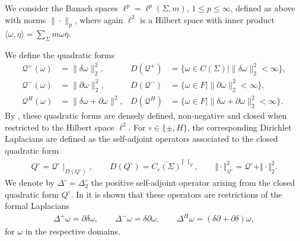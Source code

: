 \documentclass[10pt]{amsart}
\theoremstyle{definition}
\newcommand{\F}{{F}}
\newcommand{\Q}{\mathcal{Q}}
\begin{document}
We consider the Banach spaces $\ell^p=\ell^p( \Sigma,m)$, $1\leq p\leq \infty$, defined as above with norms $\|\cdot\|_p$, where again $\ell^2$ is a Hilbert space  with inner product $\langle\omega,\eta\rangle = \sum_{ \Sigma}m\omega\overline{\eta}$.


We define the quadratic forms
\begin{align*}
\Q^+(\omega) &= \|\delta\omega\|^{2}_2, & D(\Q^+) &= \lbrace \omega\in C(\Sigma)\mid \|\delta\omega\|^{2}_2<\infty\rbrace,\\
\Q^-(\omega) &= \|\partial\omega\|^{2}_2, & D(\Q^-) &= \lbrace \omega\in \F\mid\|\partial\omega\|^{2}_2<\infty\rbrace,\\
\Q^H(\omega) &= \|\delta\omega+\partial\omega\|^{2}, & D(\Q^H) &= \lbrace \omega\in \F\mid\|\delta\omega+\partial\omega\|^{2}_2<\infty\rbrace.
\end{align*}
By \cite[Section~3.1]{BK}, these quadratic forms are densely defined, non-negative and closed when restricted to the Hilbert space $\ell^2.$
For $\circ\in\{\pm,H\}$, the corresponding Dirichlet Laplacians are defined as the self-adjoint operators associated to the closed quadratic form
\begin{align*}
Q^\circ  = \Q^\circ\mid_{D(Q^\circ)}, \qquad D(Q^{\circ} ) = \overline{C_c(\Sigma)}^{\Vert\cdot\Vert_{\Q^{\circ}}},\qquad\Vert\cdot\Vert^2_{\mathcal{Q}^{\circ}} = \mathcal{Q}^{\circ}+\Vert\cdot\Vert^2_2.
\end{align*}
We denote by $\Delta^\circ=\Delta^\circ_2$ the positive self-adjoint operator arising from the closed quadratic form $Q^{\circ}$. %
In \cite[Theorem 3.4]{BK} it is shown that these operators are restrictions of the formal Laplacians
\begin{align*}
\Delta^+ \omega=  \partial\delta \omega, \qquad \Delta^-  \omega= \delta\partial \omega, \qquad \Delta^H  \omega= (\delta\partial+\partial\delta) \omega,
\end{align*}
for  $ \omega$ in the respective domains. 
\end{document}
